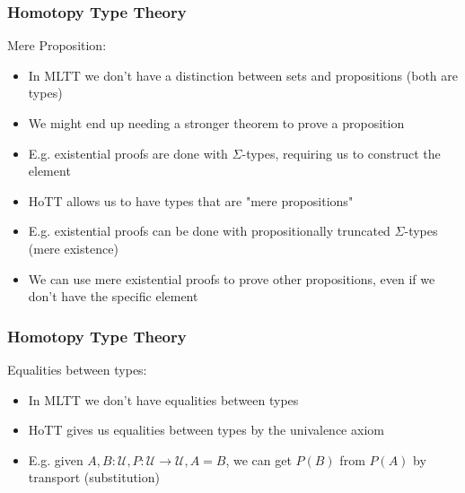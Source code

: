 \documentclass[9pt]{beamer}
\begin{document}
\begin{frame}
\frametitle{Homotopy Type Theory}

Mere Proposition:

\begin{itemize}

  \item In MLTT we don't have a distinction between sets and propositions (both are types)
  \item We might end up needing a stronger theorem to prove a proposition
  \item E.g. existential proofs are done with $\Sigma$-types, requiring us to construct the element
  \item<2-> HoTT allows us to have types that are "mere propositions"
  \item<2-> E.g. existential proofs can be done with propositionally truncated $\Sigma$-types (mere existence)
  \item<2-> We can use mere existential proofs to prove other propositions, even if we don't have the specific element

\end{itemize}

\end{frame}

\begin{frame}
\frametitle{Homotopy Type Theory}
Equalities between types:

\begin{itemize}

  \item In MLTT we don't have equalities between types
  \item HoTT gives us equalities between types by the univalence axiom 
  \item E.g. given $A, B : \mathcal{U}, P : \mathcal{U} \rightarrow \mathcal{U}, A = B$,
        we can get $P(B)$ from $P(A)$ by transport (substitution)

\end{itemize}


\end{frame}
\end{document}

